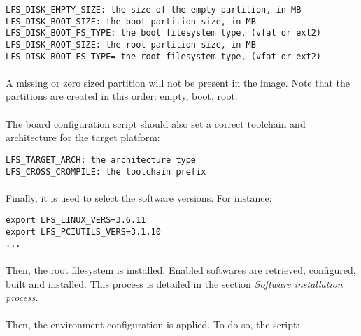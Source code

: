 \documentclass[a4paper, 11pt]{article}
\begin{document}
\begin{lstlisting}[frame=tb]
LFS_DISK_EMPTY_SIZE: the size of the empty partition, in MB
LFS_DISK_BOOT_SIZE: the boot partition size, in MB
LFS_DISK_BOOT_FS_TYPE: the boot filesystem type, (vfat or ext2)
LFS_DISK_ROOT_SIZE: the root partition size, in MB
LFS_DISK_ROOT_FS_TYPE= the root filesystem type, (vfat or ext2)
\end{lstlisting}

\paragraph{}
A missing or zero sized partition will not be present in the image. Note that
the partitions are created in this order: empty, boot, root.

\paragraph{}
The board configuration script should also set a correct toolchain and
architecture for the target platform:\\

\begin{lstlisting}[frame=tb]
LFS_TARGET_ARCH: the architecture type
LFS_CROSS_CROMPILE: the toolchain prefix
\end{lstlisting}

\paragraph{}
Finally, it is used to select the software versions. For instance:\\
\begin{lstlisting}[frame=tb]
export LFS_LINUX_VERS=3.6.11
export LFS_PCIUTILS_VERS=3.1.10
...
\end{lstlisting}

\paragraph{}
Then, the root filesystem is installed. Enabled softwares are retrieved,
configured, built and installed. This process is detailed in the section
\textit{Software installation process}.

\paragraph{}
Then, the environment configuration is applied. To do so, the script:\\
\end{document}
